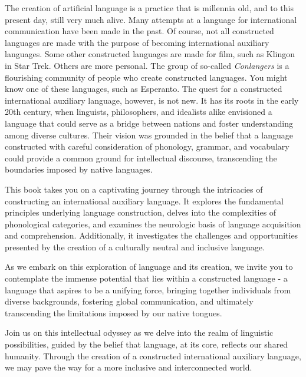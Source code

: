 The creation of artificial language is a practice that is millennia old, and to
this present day, still very much alive. Many attempts at a language for
international communication have been made in the past. Of course, not all
constructed languages are made with the purpose of becoming international
auxiliary languages. Some other constructed languages are made for film, such
as Klingon in Star Trek. Others are more personal. The group of so-called {\it Conlangers} is a flourishing
community of people who create constructed languages. You might know one of
these languages, such as Esperanto. The quest for a constructed international
auxiliary language, however, is not new. It has its roots in the early 20th
century, when linguists, philosophers, and idealists alike envisioned a
language that could serve as a bridge between nations and foster understanding
among diverse cultures. Their vision was grounded in the belief that a language
constructed with careful consideration of phonology, grammar, and vocabulary
could provide a common ground for intellectual discourse, transcending the
boundaries imposed by native languages.


This book takes you on a captivating journey through the intricacies of constructing an international auxiliary language. It explores the fundamental principles underlying language construction, delves into the complexities of phonological categories, and examines the neurologic basis of language acquisition and comprehension. Additionally, it investigates the challenges and opportunities presented by the creation of a culturally neutral and inclusive language. 

As we embark on this exploration of language and its creation, we invite you to contemplate the immense potential that lies within a constructed language - a language that aspires to be a unifying force, bringing together individuals from diverse backgrounds, fostering global communication, and ultimately transcending the limitations imposed by our native tongues. 

Join us on this intellectual odyssey as we delve into the realm of linguistic possibilities, guided by the belief that language, at its core, reflects our shared humanity. Through the creation of a constructed international auxiliary language, we may pave the way for a more inclusive and interconnected world. 

 

